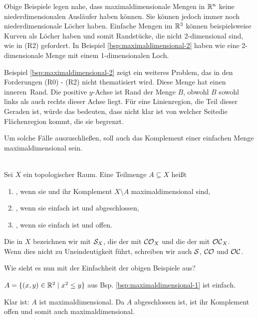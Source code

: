     Obige
    Beispiele legen nahe, dass maximaldimensionale Mengen in $\mathbb{R}^n$ keine niederdimensionalen Ausläufer haben können.
    Sie können jedoch immer noch niederdimensionale Löcher haben.
    Einfache Mengen im $\mathbb{R}^3$ können beispielsweise Kurven als Löcher haben und somit Randstücke, die nicht 2-dimensional sind, wie in (R2) gefordert. 
    In Beispiel \ref{bsp:maximaldimensional-2} haben wie eine 2-dimensionale Menge mit einem 1-dimensionalen Loch.
    
    Beispiel \ref{bsp:maximaldimensional-2} zeigt ein weiteres Problem, das in den Forderungen (R0) - (R2) nicht thematisiert wird. Diese Menge hat einen \glqq inneren\grqq\ Rand. Die positive $y$-Achse ist Rand der Menge $B$, obwohl $B$ sowohl links als auch rechts dieser Achse liegt. Für eine Linienregion, die Teil dieser Geraden ist, würde das bedeuten, dass nicht klar ist \glqq von welcher Seite\grqq die Flächenregion kommt, die sie begrenzt.
    
    Um
    solche Fälle auszuschließen, soll auch das Komplement einer einfachen Menge maximaldimensional sein.

    \begin{dfn}\label{def:einf}\ \\
        Sei $X$ ein topologischer Raum. Eine Teilmenge $A \subseteq X$ heißt 
        \begin{enumerate}
            \item {}, wenn sie und ihr Komplement $X \setminus A$ maximaldimensional sind,
            \item {}, wenn sie einfach ist und abgeschlossen,
            \item {}, wenn sie einfach ist und offen.
        \end{enumerate}
        Die  in $X$ bezeichnen wir mit $\mathcal{S}_X$, die der  mit $\mathcal{CO}_X$ und die der  mit $\mathcal{OC}_X$.\\
        Wenn dies nicht zu Uneindeutigkeit führt, schreiben wir auch $\mathcal{S}$, $\mathcal{CO}$ und $\mathcal{OC}$.
    \end{dfn}
    
    Wie sieht es nun mit der Einfachheit der obigen Beispiele aus?
    \begin{bsp}\label{bsp:einfach}
        $A = \{(x,y) \in \mathbb{R}^2 \mid x^2 \leq y\}$ aus Bsp. \ref{bsp:maximaldimensional-1} ist einfach.
    \end{bsp}
    \begin{bew}
        Klar ist: $A$ ist maximaldimensional. Da $A$ abgeschlossen ist, ist ihr Komplement offen und somit auch maximaldimensional.
    \end{bew}

